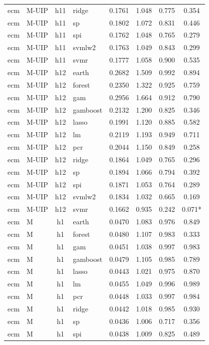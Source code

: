 \begin{ThreePartTable}
\begin{longtable}[t]{llclcccc}
ecm & M-UIP & h11 & ridge & 0.1761 & 1.048 & 0.775 & 0.354\\
ecm & M-UIP & h11 & sp & 0.1802 & 1.072 & 0.831 & 0.446\\
ecm & M-UIP & h11 & spi & 0.1762 & 1.048 & 0.765 & 0.279\\
ecm & M-UIP & h11 & svmlw2 & 0.1763 & 1.049 & 0.843 & 0.299\\
ecm & M-UIP & h11 & svmr & 0.1777 & 1.058 & 0.900 & 0.535\\
\addlinespace
ecm & M-UIP & h12 & earth & 0.2682 & 1.509 & 0.992 & 0.894\\
ecm & M-UIP & h12 & forest & 0.2350 & 1.322 & 0.925 & 0.759\\
ecm & M-UIP & h12 & gam & 0.2956 & 1.664 & 0.912 & 0.790\\
ecm & M-UIP & h12 & gamboost & 0.2132 & 1.200 & 0.825 & 0.346\\
ecm & M-UIP & h12 & lasso & 0.1991 & 1.120 & 0.885 & 0.582\\
ecm & M-UIP & h12 & lm & 0.2119 & 1.193 & 0.949 & 0.711\\
ecm & M-UIP & h12 & pcr & 0.2044 & 1.150 & 0.849 & 0.258\\
ecm & M-UIP & h12 & ridge & 0.1864 & 1.049 & 0.765 & 0.296\\
ecm & M-UIP & h12 & sp & 0.1894 & 1.066 & 0.794 & 0.392\\
ecm & M-UIP & h12 & spi & 0.1871 & 1.053 & 0.764 & 0.289\\
ecm & M-UIP & h12 & svmlw2 & 0.1834 & 1.032 & 0.665 & 0.169\\
ecm & M-UIP & h12 & svmr & 0.1662 & 0.935 & 0.242 & 0.071*\\
\addlinespace
ecm & M & h1 & earth & 0.0470 & 1.083 & 0.976 & 0.849\\
ecm & M & h1 & forest & 0.0480 & 1.107 & 0.983 & 0.333\\
ecm & M & h1 & gam & 0.0451 & 1.038 & 0.997 & 0.983\\
ecm & M & h1 & gamboost & 0.0479 & 1.105 & 0.985 & 0.789\\
ecm & M & h1 & lasso & 0.0443 & 1.021 & 0.975 & 0.870\\
ecm & M & h1 & lm & 0.0455 & 1.049 & 0.996 & 0.989\\
ecm & M & h1 & pcr & 0.0448 & 1.033 & 0.997 & 0.984\\
ecm & M & h1 & ridge & 0.0442 & 1.018 & 0.985 & 0.930\\
ecm & M & h1 & sp & 0.0436 & 1.006 & 0.717 & 0.356\\
ecm & M & h1 & spi & 0.0438 & 1.009 & 0.825 & 0.489\\

\end{longtable}
\end{ThreePartTable}
